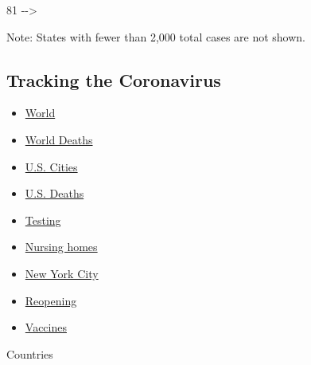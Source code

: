 81 -\/-\textgreater{}

Note: States with fewer than 2,000 total cases are not shown.

\hypertarget{tracking-the-coronavirus}{%
\subsection{Tracking the Coronavirus}\label{tracking-the-coronavirus}}

\begin{itemize}
\tightlist
\item
  \href{https://www.nytimes3xbfgragh.onion/interactive/2020/world/coronavirus-maps.html}{World}
\item
  \href{https://www.nytimes3xbfgragh.onion/interactive/2020/04/21/world/coronavirus-missing-deaths.html}{World
  Deaths}
\item
  \href{https://www.nytimes3xbfgragh.onion/interactive/2020/04/23/upshot/five-ways-to-monitor-coronavirus-outbreak-us.html}{U.S.
  Cities}
\item
  \href{https://www.nytimes3xbfgragh.onion/interactive/2020/05/05/us/coronavirus-death-toll-us.html}{U.S.
  Deaths}
\item
  \href{https://www.nytimes3xbfgragh.onion/interactive/2020/us/coronavirus-testing.html}{Testing}
\item
  \href{https://www.nytimes3xbfgragh.onion/interactive/2020/us/coronavirus-nursing-homes.html}{Nursing
  homes}
\item
  \href{https://www.nytimes3xbfgragh.onion/interactive/2020/nyregion/new-york-city-coronavirus-cases.html}{New
  York City}
\item
  \href{https://www.nytimes3xbfgragh.onion/interactive/2020/us/states-reopen-map-coronavirus.html}{Reopening}
\item
  \href{https://www.nytimes3xbfgragh.onion/interactive/2020/science/coronavirus-vaccine-tracker.html}{Vaccines}
\end{itemize}

Countries

